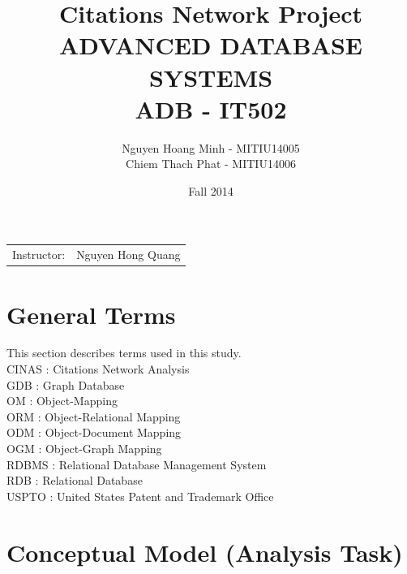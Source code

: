 \documentclass{article}
\title{Citations Network Project\\ ADVANCED DATABASE SYSTEMS \\ADB - IT502} %
\author{Nguyen Hoang Minh - MITIU14005\\Chiem Thach Phat - MITIU14006} %
\date{Fall 2014} %
\begin{document}
\maketitle
\begin{center}
\begin{tabular}{l r}
Instructor: & Nguyen Hong Quang
\end{tabular}
\end{center}


\section{General Terms}

This section describes terms used in this study.\\
CINAS : Citations Network Analysis\\
GDB : Graph Database\\
OM : Object-Mapping \\
ORM : Object-Relational Mapping \\
ODM : Object-Document Mapping \\
OGM : Object-Graph Mapping \\
RDBMS : Relational Database Management System \\
RDB : Relational Database\\
USPTO : United States Patent and Trademark Office\\


\section{Conceptual Model (Analysis Task)}
\end{document}
